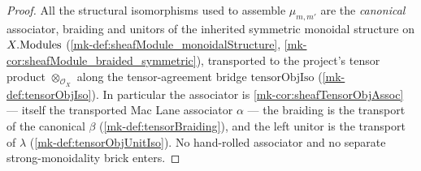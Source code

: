 \begin{proof}
  \leanok
  All the structural isomorphisms used to assemble \(\mu_{m,m'}\) are the
  \emph{canonical} associator, braiding and unitors of the inherited symmetric
  monoidal structure on \(X.\mathrm{Modules}\) (\ref{mk-def:sheafModule_monoidalStructure},
  \ref{mk-cor:sheafModule_braided_symmetric}), transported to the project's tensor
  product \(\otimes_{\mathcal{O}_X}\) along the tensor-agreement bridge
  \(\mathrm{tensorObjIso}\) (\ref{mk-def:tensorObjIso}). In particular the associator
  is \ref{mk-cor:sheafTensorObjAssoc} --- itself the transported Mac Lane associator
  \(\alpha\) --- the braiding is the transport of the canonical \(\beta\)
  (\ref{mk-def:tensorBraiding}), and the left unitor is the transport of \(\lambda\)
  (\ref{mk-def:tensorObjUnitIso}). No hand-rolled associator and no separate
  strong-monoidality brick enters.


\end{proof}
